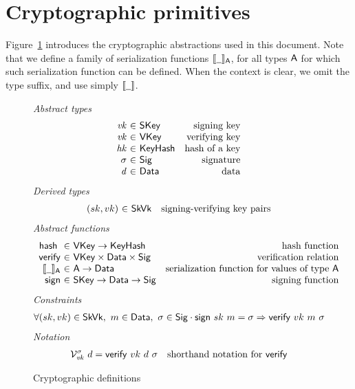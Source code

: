 \section{Cryptographic primitives}
\label{sec:crypto-primitives}

Figure~\ref{fig:crypto-defs} introduces the cryptographic abstractions used in
this document. Note that we define a family of serialization functions
$\serialised{\wcard}_\type{A}$, for all types $\mathsf{A}$ for which such
serialization function can be defined. When the context is clear, we omit the
type suffix, and use simply $\serialised{\wcard}$.

\begin{figure}[htb]
  \emph{Abstract types}
  \begin{equation*}
    \begin{array}{r@{~\in~}lr}
      \var{vk} & \SKey & \text{signing key}\\
      \var{vk} & \VKey & \text{verifying key}\\
      \var{hk} & \KeyHash & \text{hash of a key}\\
      \sigma & \Sig  & \text{signature}\\
      \var{d} & \Data  & \text{data}\\
    \end{array}
  \end{equation*}
  \emph{Derived types}
  \begin{equation*}
    \begin{array}{r@{~\in~}lr}
      (sk, vk) & \SkVk & \text{signing-verifying key pairs}
    \end{array}
  \end{equation*}
  \emph{Abstract functions}
  \begin{equation*}
    \begin{array}{r@{~\in~}lr}
      \hash{} & \VKey \to \KeyHash
      & \text{hash function} \\
      \fun{verify} & \VKey \times \Data \times \Sig
      & \text{verification relation}\\
      \serialised{\wcard}_\type{A} & \type{A} \to \Data
      & \text{serialization function for values of type $\type{A}$}\\
      \fun{sign} & \SKey \to \Data \to \Sig
      & \text{signing function}
    \end{array}
  \end{equation*}
  \emph{Constraints}
  \begin{align*}
    & \forall (sk, vk) \in \mathsf{SkVk},~ m \in \mathsf{Data},~ \sigma \in \mathsf{Sig} \cdot
      \mathsf{sign} ~ sk ~ m = \sigma \Rightarrow \mathsf{verify} ~ vk ~ m ~ \sigma
  \end{align*}
  \emph{Notation}
  \begin{align*}
    & \mathcal{V}^\sigma_{\mathit{vk}}~{d} = \mathsf{verify} ~ vk ~ d ~ \sigma
      & \text{shorthand notation for } \mathsf{verify}
  \end{align*}
  \caption{Cryptographic definitions}
  \label{fig:crypto-defs}
\end{figure}

